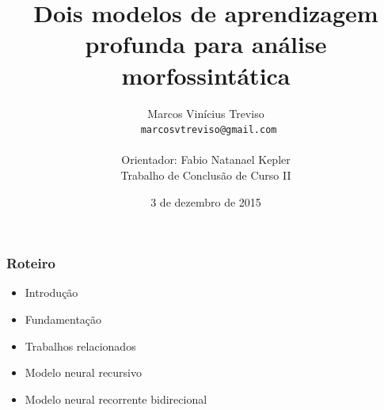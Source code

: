 \documentclass[10pt]{beamer}
\title{Dois modelos de aprendizagem profunda para análise morfossintática}
\subtitle{}
\date{3 de dezembro de 2015}
\author[Treviso]{Marcos Vinícius Treviso\\\scriptsize\texttt{ marcosvtreviso@gmail.com}\\\\Orientador: Fabio Natanael Kepler\\\tiny{Trabalho de Conclusão de Curso II}\\}
\institute{Universidade Federal do Pampa}
\begin{document}
\maketitle


\begin{frame}
  \frametitle{Roteiro}


  \begin{itemize}


    \item Introdução

    \item Fundamentação


    \item Trabalhos relacionados

    \item Modelo neural recursivo

    \item Modelo neural recorrente bidirecional


\end{itemize}
\end{frame}
\end{document}
